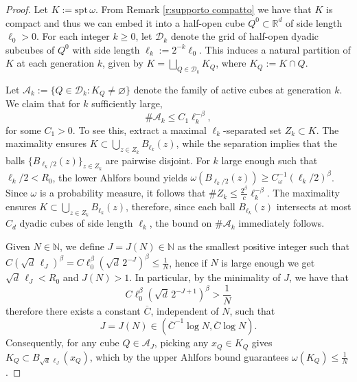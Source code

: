 \documentclass[12pt,a4paper,oneside]{amsart}
\theoremstyle{plain}
\theoremstyle{definition}
\numberwithin{equation}{section}
\numberwithin{figure}{section}
\numberwithin{table}{section}
\theoremstyle{remark}
\newcommand{\N}{\mathbb{N}}
\newcommand{\expAhlfors}{\beta}
\begin{document}
\begin{proof}
Let $K:=\mathrm{spt}\, \omega$. From Remark \ref{r:supporto compatto} we have that $K$ is compact and thus we can embed it into a half-open cube $Q^0 \subset \mathbb{R}^d$ of side length $\ell_0 > 0$. For each integer $k \ge 0$, let $\mathcal{D}_k$ denote the grid of half-open dyadic subcubes of $Q^0$ with side length $\ell_k := 2^{-k}\ell_0$. This induces a natural partition of $K$ at each generation $k$, given by $K = \bigsqcup_{Q\in\mathcal{D}_k} K_Q$, where $K_Q := K \cap Q$. 

Let $\mathcal{A}_k := \{Q \in \mathcal{D}_k : K_Q \neq \varnothing\}$ denote the family of active cubes at generation $k$. We claim that for $k$ sufficiently large, 
\begin{equation}\label{e:cardinal Ak}
\#\mathcal{A}_k \le C_1 \ell_k^{-\expAhlfors},    
\end{equation}
for some $C_1>0$. To see this, extract a maximal $\ell_k$-separated set $Z_k \subset K$. The maximality ensures $K \subset \bigcup_{z\in Z_k} B_{\ell_k}(z)$, while the separation implies that the balls $\{B_{\ell_k/2}(z)\}_{z\in Z_k}$ are pairwise disjoint. For $k$ large enough such that $\ell_k/2 < R_0$, the lower Ahlfors bound yields $\omega(B_{\ell_k/2}(z)) \ge C^{-1}_{\omega}(\ell_k/2)^\expAhlfors $. Since $\omega$ is a probability measure, it follows that $\# Z_k \le \frac{2^\expAhlfors }{c} \ell_k^{-\expAhlfors}$. The maximality ensures $K \subset \bigcup_{z\in Z_k} B_{\ell_k}(z)$, therefore, since each ball $B_{\ell_k}(z)$ intersects at most $C_d$ dyadic cubes of side length $\ell_k$, the bound on $\#\mathcal{A}_k$ immediately follows.

Given $N\in \N$, we define  $J = J(N)\in \N$ as the smallest positive integer such that $ C(\sqrt{d}\,\ell_J)^\expAhlfors = C\ell_0^\expAhlfors (\sqrt{d}\,2^{-J})^\expAhlfors  \le \frac1N$, hence if $N$ is large enough we get $\sqrt{d}\,\ell_J < R_0$ and $J(N)>1$. In particular, by the minimality of $J$, we have that 
\begin{equation}\label{e:Def di J}
    C\ell_0^\expAhlfors (\sqrt{d}\,2^{-J+1})^\expAhlfors  > \frac1N
\end{equation}
therefore there exists a constant $\overline{C}$, independent of $N$, such that 
\begin{equation}\label{e:logN J}
    J=J(N)\in( \overline{C}^{-1} \log N,\overline{C} \log N).
\end{equation}
Consequently, for any cube $Q \in \mathcal{A}_J$, picking any $x_Q \in K_Q$ gives $K_Q \subset B_{\sqrt{d}\,\ell_J}(x_Q)$, which by the upper Ahlfors bound guarantees $\omega(K_Q) \le \frac1N$.


\end{proof}
\end{document}
